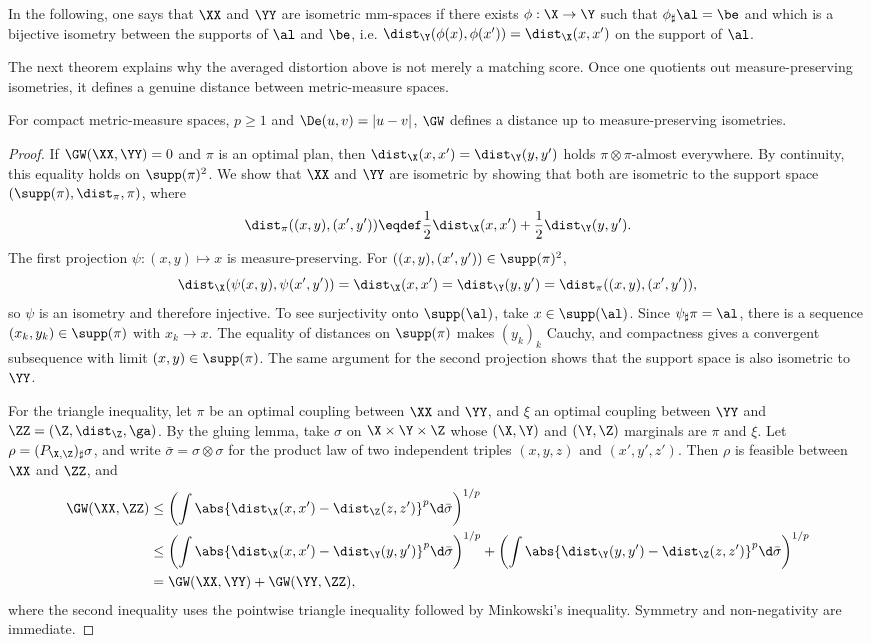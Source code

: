 In the following, one says that $\XX$ and $\YY$ are isometric mm-spaces if there exists $\phi : \X \rightarrow \Y$ such that $\phi_{\sharp}\al=\be$ and which is a bijective isometry between the supports of $\al$ and $\be$, i.e. $\dist_\Y(\phi(x),\phi(x'))=\dist_\X(x,x')$ on the support of $\al$.

The next theorem explains why the averaged distortion above is not merely a matching score. Once one quotients out measure-preserving isometries, it defines a genuine distance between metric-measure spaces.

\begin{thm}\label{thm-gw-metric}
	For compact metric-measure spaces, $p\geq1$ and $\De(u,v)=|u-v|$, $\GW$ defines a distance up to measure-preserving isometries.
\end{thm}

\begin{proof}
	If $\GW(\XX,\YY)=0$ and $\pi$ is an optimal plan, then $\dist_\X(x,x')=\dist_\Y(y,y')$ holds $\pi\otimes\pi$-almost everywhere. By continuity, this equality holds on $\supp(\pi)^2$. We show that $\XX$ and $\YY$ are isometric by showing that both are isometric to the support space $(\supp(\pi),\dist_\pi,\pi)$, where
	\[
		\dist_\pi((x,y),(x',y'))
		\eqdef
		\frac12\dist_\X(x,x')+\frac12\dist_\Y(y,y').
	\]
	The first projection $\psi:(x,y)\mapsto x$ is measure-preserving. For $((x,y),(x',y'))\in\supp(\pi)^2$,
	\[
		\dist_\X(\psi(x,y),\psi(x',y'))
		=
		\dist_\X(x,x')
		=
		\dist_\Y(y,y')
		=
		\dist_\pi((x,y),(x',y')),
	\]
	so $\psi$ is an isometry and therefore injective. To see surjectivity onto $\supp(\al)$, take $x\in\supp(\al)$. Since $\psi_\sharp\pi=\al$, there is a sequence $(x_k,y_k)\in\supp(\pi)$ with $x_k\to x$. The equality of distances on $\supp(\pi)$ makes $(y_k)_k$ Cauchy, and compactness gives a convergent subsequence with limit $(x,y)\in\supp(\pi)$. The same argument for the second projection shows that the support space is also isometric to $\YY$.

	For the triangle inequality, let $\pi$ be an optimal coupling between $\XX$ and $\YY$, and $\xi$ an optimal coupling between $\YY$ and $\ZZ=(\Z,\dist_\Z,\ga)$. By the gluing lemma, take $\sigma$ on $\X\times\Y\times\Z$ whose $(\X,\Y)$ and $(\Y,\Z)$ marginals are $\pi$ and $\xi$. Let $\rho=(P_{\X,\Z})_\sharp\sigma$, and write $\bar\sigma=\sigma\otimes\sigma$ for the product law of two independent triples $(x,y,z)$ and $(x',y',z')$. Then $\rho$ is feasible between $\XX$ and $\ZZ$, and
	\begin{align*}
		\GW(\XX,\ZZ)
		&\leq
		\left(
		\int
		\abs{\dist_\X(x,x')-\dist_\Z(z,z')}^p
		\d\bar\sigma
		\right)^{1/p} \\
		&\leq
		\left(
		\int
		\abs{\dist_\X(x,x')-\dist_\Y(y,y')}^p
		\d\bar\sigma
		\right)^{1/p}
		+
		\left(
		\int
		\abs{\dist_\Y(y,y')-\dist_\Z(z,z')}^p
		\d\bar\sigma
		\right)^{1/p} \\
		&=
		\GW(\XX,\YY)+\GW(\YY,\ZZ),
	\end{align*}
		where the second inequality uses the pointwise triangle inequality followed by Minkowski's inequality. Symmetry and non-negativity are immediate.
\end{proof}


